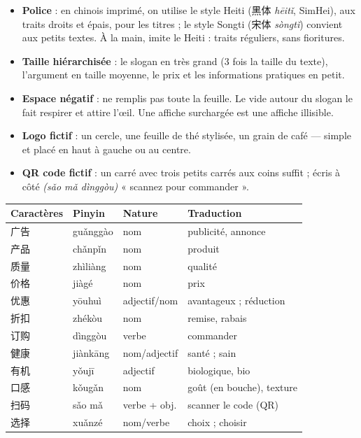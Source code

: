 \documentclass[11pt]{article}
\newcommand{\cle}[1]{{\popxbold\color{popdark}#1}}
\newcommand{\zh}[1]{\ifmmode\text{#1}\else{#1}\fi}
\begin{document}
\begin{itemize}
\item \textbf{Police} : en chinois imprimé, on utilise le style \cle{Heiti} (黑体 \emph{hēitǐ}, SimHei), aux traits droits et épais, pour les titres ; le style Songti (宋体 \emph{sòngtǐ}) convient aux petits textes. À la main, imite le Heiti : traits réguliers, sans fioritures.
\item \textbf{Taille hiérarchisée} : le slogan en très grand (3 fois la taille du texte), l'argument en taille moyenne, le prix et les informations pratiques en petit.
\item \textbf{Espace négatif} : ne remplis pas toute la feuille. Le vide autour du slogan le fait respirer et attire l'œil. Une affiche surchargée est une affiche illisible.
\item \textbf{Logo fictif} : un cercle, une feuille de thé stylisée, un grain de café — simple et placé en haut à gauche ou au centre.
\item \textbf{QR code fictif} : un carré avec trois petits carrés aux coins suffit ; écris à côté \zh{扫码订购} \emph{(sǎo mǎ dìnggòu)} « scannez pour commander ».
\end{itemize}

\begin{center}
\begin{tabularx}{\linewidth}{|X|X|X|X|}
\hline
\rowcolor{popblueL} Caractères & Pinyin & Nature & Traduction \\
\hline
广告 & guǎnggào & nom & publicité, annonce \\
\hline
产品 & chǎnpǐn & nom & produit \\
\hline
质量 & zhìliàng & nom & qualité \\
\hline
价格 & jiàgé & nom & prix \\
\hline
优惠 & yōuhuì & adjectif/nom & avantageux ; réduction \\
\hline
折扣 & zhékòu & nom & remise, rabais \\
\hline
订购 & dìnggòu & verbe & commander \\
\hline
健康 & jiànkāng & nom/adjectif & santé ; sain \\
\hline
有机 & yǒujī & adjectif & biologique, bio \\
\hline
口感 & kǒugǎn & nom & goût (en bouche), texture \\
\hline
扫码 & sǎo mǎ & verbe + obj. & scanner le code (QR) \\
\hline
选择 & xuǎnzé & nom/verbe & choix ; choisir \\
\hline
\end{tabularx}
\end{center}
\end{document}
